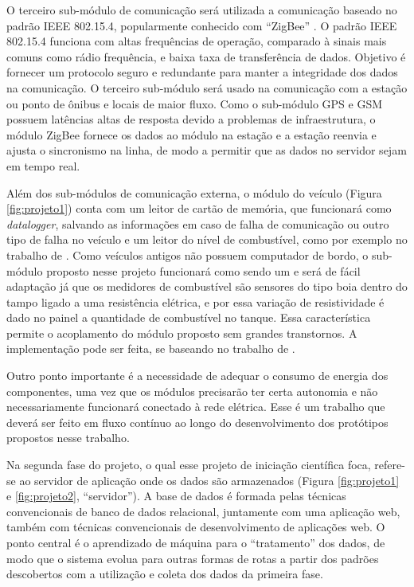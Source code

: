 \documentclass[12pt,cor2018]{uftpibic}
\begin{document}
O terceiro sub-módulo de comunicação será utilizada a comunicação baseado no padrão IEEE 802.15.4, popularmente conhecido com ``ZigBee'' \cite{Hoang}. O padrão IEEE 802.15.4 funciona com altas frequências de operação, comparado à sinais mais comuns como rádio frequência, e baixa taxa de transferência de dados. Objetivo é fornecer um protocolo seguro e redundante para manter a integridade dos dados na comunicação. O terceiro sub-módulo será usado na comunicação com a estação ou ponto de ônibus e locais de maior fluxo. Como o sub-módulo GPS e GSM possuem latências altas de resposta devido a problemas de infraestrutura, o módulo ZigBee fornece os dados ao módulo na estação e a estação reenvia e ajusta o sincronismo na linha, de modo a permitir que as dados no servidor sejam em tempo real.

Além dos sub-módulos de comunicação externa, o módulo do veículo (Figura \ref{fig:projeto1}) conta com um leitor de cartão de memória, que funcionará como \textit{datalogger}, salvando as informações em caso de falha de comunicação ou outro tipo de falha no veículo e um leitor do nível de combustível, como por exemplo no trabalho de . Como veículos antigos não possuem computador de bordo, o sub-módulo proposto nesse projeto funcionará como sendo um e será de fácil adaptação já que os medidores de combustível são sensores do tipo boia dentro do tampo ligado a uma resistência elétrica, e por essa variação de resistividade é dado no painel a quantidade de combustível no tanque. Essa característica permite o acoplamento do módulo proposto sem grandes transtornos. A implementação pode ser feita, se baseando no trabalho de .

Outro ponto importante é a necessidade de adequar o consumo de energia dos componentes, uma vez que os módulos precisarão ter certa autonomia e não necessariamente funcionará conectado à rede elétrica. Esse é um trabalho que deverá ser feito em fluxo contínuo ao longo do desenvolvimento dos protótipos propostos nesse trabalho.

Na segunda fase do projeto, o qual esse projeto de iniciação científica foca, refere-se ao servidor de aplicação onde os dados são armazenados (Figura \ref{fig:projeto1} e \ref{fig:projeto2}, ``servidor''). A base de dados é formada pelas técnicas convencionais de banco de dados relacional, juntamente com uma aplicação web, também com técnicas convencionais de desenvolvimento de aplicações web. O ponto central é o aprendizado de máquina para o ``tratamento'' dos dados, de modo que o sistema evolua para outras formas de rotas a partir dos padrões descobertos com a utilização e coleta dos dados da primeira fase.
\end{document}
